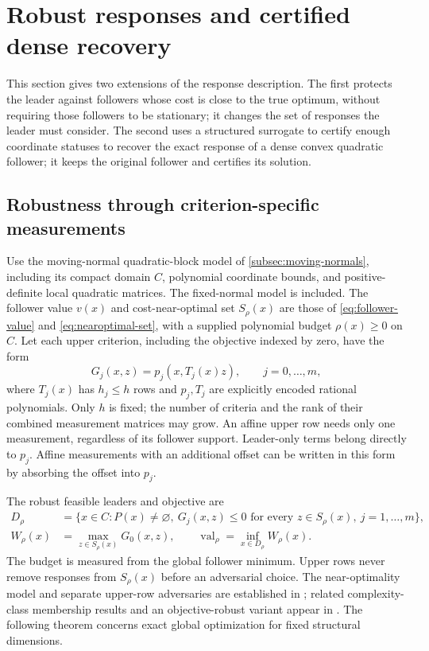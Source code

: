 \section{Robust responses and certified dense recovery}\label{sec:robust-screening}

This section gives two extensions of the response description. The first
protects the leader against followers whose cost is close to the true
optimum, without requiring those followers to be stationary; it changes the
set of responses the leader must consider. The second uses a structured
surrogate to certify enough coordinate statuses to recover the exact
response of a dense convex quadratic follower; it keeps the original
follower and certifies its solution.

\subsection{Robustness through criterion-specific measurements}\label{subsec:robust-model}

Use the moving-normal quadratic-block model of
\cref{subsec:moving-normals}, including its compact domain $C$,
polynomial coordinate bounds, and positive-definite local quadratic
matrices. The fixed-normal model is included. The follower value $v(x)$
and cost-near-optimal set $S_\rho(x)$ are those of
\eqref{eq:follower-value} and \eqref{eq:nearoptimal-set}, with a supplied polynomial
budget $\rho(x)\ge0$ on $C$. Let each upper criterion, including the
objective indexed by zero, have the form
\begin{equation}\label{eq:measured-criterion}
 G_j(x,z)=p_j(x,T_j(x)z),\qquad j=0,\ldots,m,
\end{equation}
where $T_j(x)$ has $h_j\le h$ rows and $p_j,T_j$ are explicitly encoded
rational polynomials. Only $h$ is fixed; the number of criteria and the
rank of their combined measurement matrices may grow. An affine upper
row needs only one measurement, regardless of its follower support.
Leader-only terms belong directly to $p_j$. Affine measurements with an
additional offset can be written in this form by absorbing the offset
into $p_j$.

The robust feasible leaders and objective are
\begin{align}
 D_\rho&=\{x\in C:P(x)\ne\varnothing,\
      G_j(x,z)\le0\text{ for every }z\in S_\rho(x),\ j=1,\ldots,m\},
 \label{eq:robust-domain}\\
 W_\rho(x)&=\max_{z\in S_\rho(x)}G_0(x,z),\qquad
                    \operatorname{val}_\rho=\inf_{x\in D_\rho}W_\rho(x).
 \label{eq:robust-objective}
\end{align}
The budget is measured from the global follower minimum. Upper rows
never remove responses from $S_\rho(x)$ before an adversarial choice.
The near-optimality model and separate upper-row adversaries are established
in \cite{BesanconAnjosBrotcorne2024}; related complexity-class membership
results and an objective-robust variant appear in
\cite{BesanconAnjosBrotcorne2021}. The following theorem concerns exact
global optimization for fixed structural dimensions.

